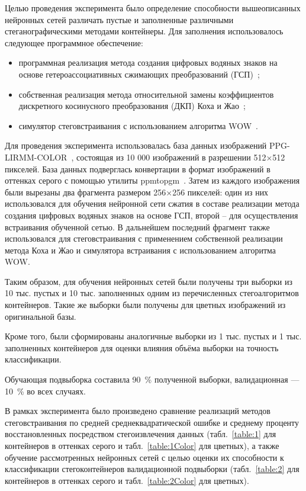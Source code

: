 Целью проведения эксперимента было определение способности вышеописанных нейронных сетей различать пустые и заполненные различными стеганографическими методами контейнеры. Для заполнения использовалось следующее программное обеспечение:
\begin{itemize}
\item программная реализация метода создания цифровых водяных знаков на основе гетероассоциативных сжимающих преобразований (ГСП)~\cite{SirotaHIC};
\item собственная реализация метода относительной замены коэффициентов дискретного косинусного преобразования (ДКП) Коха и Жао~\cite{ZhaoKoch, KochZhao};
\item симулятор стеговстраивания с использованием алгоритма WOW~\cite{WOW}.
\end{itemize}

Для проведения эксперимента использовалась база данных изображений PPG-LIRMM-COLOR~\cite{PPG-LIRMM-COLOR}, состоящая из 10 000 изображений в разрешении 512×512 пикселей. База данных подверглась конвертации в формат изображений в оттенках серого с помощью утилиты ppmtopgm~\cite{ppmtopgm}. Затем из каждого изображения были вырезаны два фрагмента размером 256×256 пикселей: один из них использовался для обучения нейронной сети сжатия в составе реализации метода создания цифровых водяных знаков на основе ГСП, второй – для осуществления встраивания обученной сетью. В дальнейшем последний фрагмент также использовался для стеговстраивания с применением собственной реализации метода Коха и Жао и симулятора встраивания с использованием алгоритма WOW.

Таким образом, для обучения нейронных сетей были получены три выборки из 10 тыс. пустых и 10 тыс. заполненных одним из перечисленных стегоалгоритмов контейнеров. Такие же выборки были получены для цветных изображений из оригинальной базы.

Кроме того, были сформированы аналогичные выборки из 1 тыс. пустых и 1 тыс. заполненных контейнеров для оценки влияния объёма выборки на точность классификации.

Обучающая подвыборка составила 90~\% полученной выборки, валидационная --- 10~\% во всех случаях.

В рамках эксперимента было произведено сравнение реализаций методов стеговстраивания по средней среднеквадратической ошибке и среднему проценту восстановленных посредством стегоизвлечения данных (табл.~\ref{table:1} для контейнеров в оттенках серого и табл.~\ref{table:1Color} для цветных), а также обучение рассмотренных нейронных сетей с целью оценки их способности к классификации стегоконтейнеров валидационной подвыборки (табл.~\ref{table:2} для контейнеров в оттенках серого и табл.~\ref{table:2Color} для цветных).

